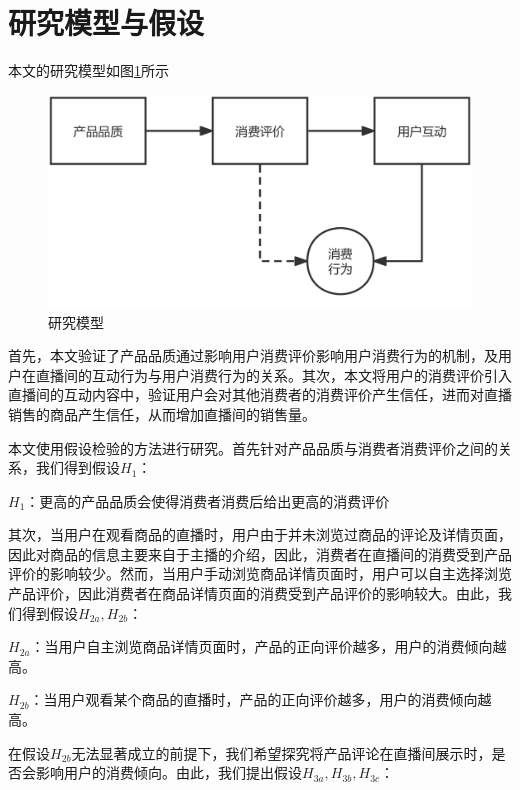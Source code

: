 \documentclass{../notes}
\begin{document}
    \section{研究模型与假设}

    本文的研究模型如图\ref{fig:1}所示

    \begin{figure}
        \centering
        \includegraphics[width=0.6\linewidth]{hw04-imgs/hw04-1.png}
        \caption{研究模型}
        \label{fig:1}
    \end{figure}

    首先，本文验证了产品品质通过影响用户消费评价影响用户消费行为的机制，及用户在直播间的互动行为与用户消费行为的关系。其次，本文将用户的消费评价引入直播间的互动内容中，验证用户会对其他消费者的消费评价产生信任，进而对直播销售的商品产生信任，从而增加直播间的销售量。

    本文使用假设检验的方法进行研究。首先针对产品品质与消费者消费评价之间的关系，我们得到假设$H_1$：

    \begin{hypothesis}
        $H_1$：更高的产品品质会使得消费者消费后给出更高的消费评价
        \label{hyp:1}
    \end{hypothesis}

    其次，当用户在观看商品的直播时，用户由于并未浏览过商品的评论及详情页面，因此对商品的信息主要来自于主播的介绍，因此，消费者在直播间的消费受到产品评价的影响较少。然而，当用户手动浏览商品详情页面时，用户可以自主选择浏览产品评价，因此消费者在商品详情页面的消费受到产品评价的影响较大。由此，我们得到假设$H_{2a}, H_{2b}$：

    \begin{hypothesis}
        $H_{2a}$：当用户自主浏览商品详情页面时，产品的正向评价越多，用户的消费倾向越高。
        \label{hyp:2a}
    \end{hypothesis}
    \begin{hypothesis}
        $H_{2b}$：当用户观看某个商品的直播时，产品的正向评价越多，用户的消费倾向越高。
        \label{hyp:2b}
    \end{hypothesis}

    在假设$H_{2b}$无法显著成立的前提下，我们希望探究将产品评论在直播间展示时，是否会影响用户的消费倾向。由此，我们提出假设$H_{3a}, H_{3b}, H_{3c}$：
\end{document}
